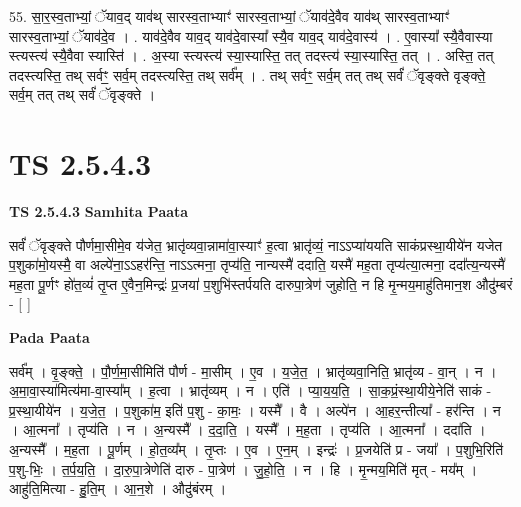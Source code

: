 \documentclass[17pt]{extarticle}
\begin{document}
55. सा॒र॒स्व॒ताभ्यां॒ ॅयाव॒द् याव॑थ् सारस्व॒ताभ्याꣳ॑ सारस्व॒ताभ्यां॒ ॅयाव॑दे॒वैव याव॑थ् सारस्व॒ताभ्याꣳ॑ सारस्व॒ताभ्यां॒ ॅयाव॑दे॒व । . याव॑दे॒वैव याव॒द् याव॑दे॒वास्या᳚ स्यै॒व याव॒द् याव॑दे॒वास्य॑ । . ए॒वास्या᳚ स्यै॒वैवास्या स्त्यस्त्य॑ स्यै॒वैवा स्यास्ति॑ । . अ॒स्या स्त्यस्त्य॑ स्या॒स्यास्ति॒ तत् तदस्त्य॑ स्या॒स्यास्ति॒ तत् । . अस्ति॒ तत् तदस्त्यस्ति॒ तथ् सर्वꣳ॒॒ सर्व॒म् तदस्त्यस्ति॒ तथ् सर्व᳚म् । . तथ् सर्वꣳ॒॒ सर्व॒म् तत् तथ् सर्वं॑ ॅवृङ्क्ते वृङ्क्ते॒ सर्व॒म् तत् तथ् सर्वं॑ ॅवृङ्क्ते । \newline
\pagebreak
{}
\section*{ TS 2.5.4.3 }

\textbf{TS 2.5.4.3 } \newline
\textbf{Samhita Paata} \newline

सर्वं॑ ॅवृङ्क्ते पौर्णमा॒सीमे॒व य॑जेत॒ भ्रातृ॑व्यवा॒न्नामा॑वा॒स्याꣳ॑ ह॒त्वा भ्रातृ॑व्यं॒ नाऽऽप्या॑ययति साकंप्रस्था॒यीये॑न यजेत प॒शुका॑मो॒यस्मै॒ वा अल्पे॑ना॒ऽऽहर॑न्ति॒ नाऽऽत्मना॒ तृप्य॑ति॒ नान्यस्मै॑ ददाति॒ यस्मै॑ मह॒ता तृप्य॑त्या॒त्मना॒ ददा᳚त्य॒न्यस्मै॑ मह॒ता पू॒र्णꣳ हो॑त॒व्यं॑ तृ॒प्त ए॒वैन॒मिन्द्रः॑ प्र॒जया॑ प॒शुभि॑स्तर्पयति दारुपा॒त्रेण॑ जुहोति॒ न हि मृ॒न्मय॒माहु॑तिमान॒श औदु॑म्बरं - [  ] \newline

\textbf{Pada Paata} \newline

सर्व᳚म् । वृ॒ङ्क्ते॒ । पौ॒र्ण॒मा॒सीमिति॑ पौर्ण - मा॒सीम् । ए॒व । य॒जे॒त॒ । भ्रातृ॑व्यवा॒निति॒ भ्रातृ॑व्य - वा॒न् । न । अ॒मा॒वा॒स्या॑मित्य॑मा-वा॒स्या᳚म् । ह॒त्वा । भ्रातृ॑व्यम् । न । एति॑ । प्या॒य॒य॒ति॒ । सा॒क॒प्रं॒स्था॒यीये॒नेति॑ साकं - प्र॒स्था॒यीये॑न । य॒जे॒त॒ । प॒शुका॑म॒ इति॑ प॒शु - का॒मः॒ । यस्मै᳚ । वै । अल्पे॑न । आ॒हर॒न्तीत्या᳚ - हर॑न्ति । न । आ॒त्मना᳚ । तृप्य॑ति । न । अ॒न्यस्मै᳚ । द॒दा॒ति॒ । यस्मै᳚ । म॒ह॒ता । तृप्य॑ति । आ॒त्मना᳚ । ददा॑ति । अ॒न्यस्मै᳚ । म॒ह॒ता । पू॒र्णम् । हो॒त॒व्य᳚म् । तृ॒प्तः । ए॒व । ए॒न॒म् । इन्द्रः॑ । प्र॒जयेति॑ प्र - जया᳚ । प॒शुभि॒रिति॑ प॒शु-भिः॒ । त॒र्प॒य॒ति॒ । दा॒रु॒पा॒त्रेणेति॑ दारु - पा॒त्रेण॑ । जु॒हो॒ति॒ । न । हि । मृ॒न्मय॒मिति॑ मृत् - मय᳚म् । आहु॑ति॒मित्या - हु॒ति॒म् । आ॒न॒शे । औदु॑बंरम् ।  \newline
\end{document}
